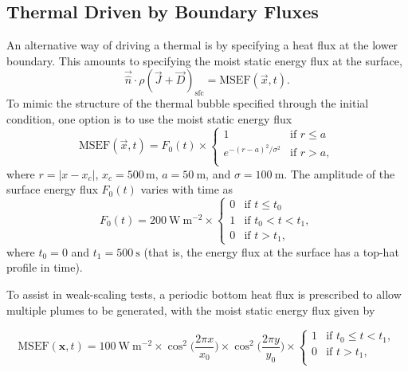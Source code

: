 \documentclass{report}
\begin{document}
\subsection{Thermal Driven by Boundary Fluxes}

An alternative way of driving a thermal is by specifying a heat flux at the lower boundary. This amounts to specifying the moist static energy flux at the surface,
\begin{equation}
    \vec{\hat n} \cdot \rho (\vec{J} + \vec{D})_\mathrm{sfc} = \mathrm{MSEF}(\vec{x}, t).
\end{equation}
To mimic the structure of the thermal bubble specified through the initial condition, one option is to use the moist static energy flux
\begin{equation}
     \mathrm{MSEF}(\vec{x}, t) =  F_0(t) \times \left\{ \begin{array}{ll}
 1 & \text{if } r \leq a\\
 e^{-(r - a)^2/\sigma^2} & \text{if } r > a,\\
\end{array} \right.
\end{equation}
where $r = |x-x_{c}|$, $x_c = 500\,\mathrm{m}$, $a=50~\mathrm{m}$, and $\sigma = 100~\mathrm{m}$. The amplitude of the surface energy flux $F_0(t)$ varies with time as
\begin{equation}
   F_0(t) =
   200~\mathrm{W~m^{-2}}\times 
   \left\{ \begin{array}{ll}
 0 & \text{if } t \leq t_0\\
 1 & \text{if } t_0 < t < t_1,\\
 0 & \text{if } t > t_1,
 \end{array}\right.
\end{equation}
where $t_0=0$ and $t_1 = 500~\mathrm{s}$ (that is, the energy flux at the surface has a top-hat profile in time). 

To assist in weak-scaling tests, a periodic bottom heat flux is prescribed to allow multiple plumes to be generated, with the moist static energy flux given by

\begin{equation}
\mathrm{MSEF}(\mathbf{x},t) = 
   100~\mathrm{W~m^{-2}}\times \cos^2{\Big(\frac{2\pi x}{x_{0}}\Big)}\times \cos^2{\Big(\frac{2\pi y}{y_{0}}\Big)} \times
   \left\{ \begin{array}{ll}
    1 & \text{if } t_0 \leq t < t_1,\\
    0 & \text{if } t > t_1, \\
     \end{array}\right.
\end{equation}
\end{document}
